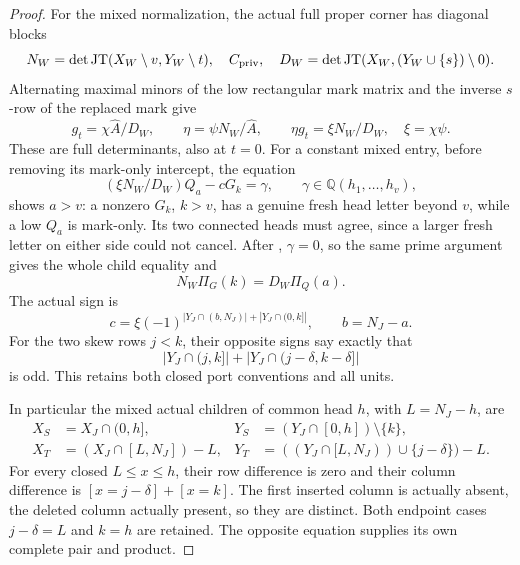 \documentclass[11pt,a4paper]{amsart}
\numberwithin{equation}{section}
\theoremstyle{plain}
\theoremstyle{definition}
\newcommand{\Q}{\mathbb Q}
\newcommand{\JT}{\operatorname{JT}}
\begin{document}
\begin{proof}
For the mixed normalization, the actual full proper corner has diagonal
blocks
\[
 N_W=\det\JT(X_W\setminus v,Y_W\setminus t),\quad
 C_{\rm priv},\quad
 D_W=\det\JT(X_W,(Y_W\cup\{s\})\setminus0).
\]
Alternating maximal minors of the low rectangular mark matrix and the
inverse \(s\)-row of the replaced mark give
\[
 g_t=\chi\widehat A/D_W,\qquad
 \eta=\psi N_W/\widehat A,\qquad
 \eta g_t=\xi N_W/D_W,\quad \xi=\chi\psi.
\]
These are full determinants, also at \(t=0\).
For a constant mixed entry, before removing its mark-only intercept,
the equation
\[
 (\xi N_W/D_W)Q_a-cG_k=\gamma,\qquad \gamma\in\Q(h_1,\ldots,h_v),
\]
shows \(a>v\): a nonzero \(G_k\), \(k>v\), has a genuine fresh head
letter beyond \(v\), while a low \(Q_a\) is mark-only.
Its two connected heads must agree, since a larger fresh letter on
either side could not cancel.
After , \(\gamma=0\), so the same prime
argument gives the whole child equality and
\[
 N_W\Pi_G(k)=D_W\Pi_Q(a).
\]
The actual sign is
\[
 c=\xi(-1)^{|Y_J\cap(b,N_J)|+|Y_J\cap(0,k]|},\qquad b=N_J-a.
\]
For the two skew rows \(j<k\), their opposite signs say exactly that
\[
 |Y_J\cap(j,k]|+|Y_J\cap(j-\delta,k-\delta]|
\]
is odd.  This retains both closed port conventions and all units.

In particular the mixed actual children of common head \(h\), with
\(L=N_J-h\), are
\[
 \begin{aligned}
 X_S&=X_J\cap(0,h],&
 Y_S&=(Y_J\cap[0,h])\setminus\{k\},\\
 X_T&=(X_J\cap[L,N_J])-L,&
 Y_T&=((Y_J\cap[L,N_J))\cup\{j-\delta\})-L.
 \end{aligned}
\]
For every closed \(L\le x\le h\), their row difference is zero and their
column difference is
\([x=j-\delta]+[x=k]\).  The first inserted column is actually absent,
the deleted column actually present, so they are distinct.
Both endpoint cases \(j-\delta=L\) and \(k=h\) are retained.
The opposite equation supplies its own complete pair and product.
\end{proof}
\end{document}
